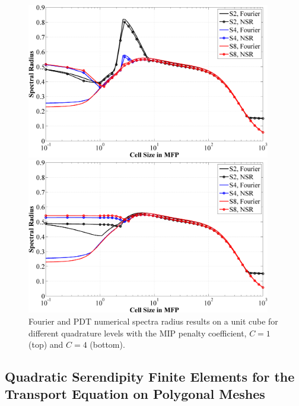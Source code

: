 \documentclass[11pt]{article}
\begin{document}
\begin{figure}[!ht]
\centering
\includegraphics[width=0.95\textwidth]{figures/SI_MIP_hex_C=1_LS2,4,8_F&NSR_PDT.png}

\vspace{8mm}

\includegraphics[width=0.95\textwidth]{figures/SI_MIP_hex_C=4_LS2,4,8_F&NSR_PDT.png}
\caption{Fourier and PDT numerical spectra radius results on a unit cube for different quadrature levels with the MIP penalty coefficient, $C=1$ (top) and $C=4$ (bottom).}
\label{fig::fourier_NSR}
\end{figure}

\subsection{Quadratic Serendipity Finite Elements for the Transport Equation on Polygonal Meshes}
\label{sec::CW_quad}
\end{document}
